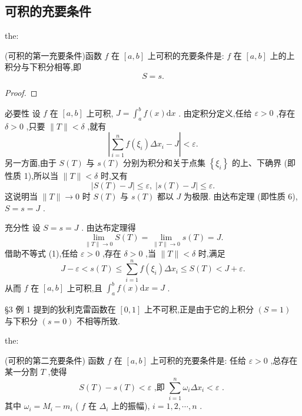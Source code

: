 \subsection{可积的充要条件}

\begin{theorem}{}{the:}

\end{theorem}
(可积的第一充要条件)函数 \(f\) 在 \(\left\lbrack  {a,b}\right\rbrack\) 上可积的充要条件是: \(f\) 在 \(\left\lbrack  {a,b}\right\rbrack\) 上的上积分与下积分相等,即
\[
S = s.
\]
\begin{proof}

\end{proof}
必要性 设 \(f\) 在 \(\left\lbrack  {a,b}\right\rbrack\) 上可积, \(J = {\int }_{a}^{b}f\left( x\right) \mathrm{d}x\) . 由定积分定义,任给 \(\varepsilon  > 0\) ,存在 \(\delta  > 0\) ,只要 \(\parallel T\parallel  < \delta\) ,就有
\[
\left| {\mathop{\sum }\limits_{{i = 1}}^{n}f\left( {\xi }_{i}\right) \Delta {x}_{i} - J}\right|  < \varepsilon .
\]
另一方面,由于 \(S\left( T\right)\) 与 \(s\left( T\right)\) 分别为积分和关于点集 \(\left\{  {\xi }_{i}\right\}\) 的上、下确界 (即性质 1),所以当 \(\parallel T\parallel  < \delta\) 时,又有
\[
\left| {S\left( T\right)  - J}\right|  \leq  \varepsilon ,\;\left| {s\left( T\right)  - J}\right|  \leq  \varepsilon .
\]
这说明当 \(\parallel T\parallel  \rightarrow  0\) 时 \(S\left( T\right)\) 与 \(s\left( T\right)\) 都以 \(J\) 为极限. 由达布定理 (即性质 6), \(S = s = J\) .

充分性 设 \(S = s = J\) . 由达布定理得
\[
\mathop{\lim }\limits_{{\parallel T\parallel  \rightarrow  0}}S\left( T\right)  = \mathop{\lim }\limits_{{\parallel T\parallel  \rightarrow  0}}s\left( T\right)  = J. \tag{5}
\]
借助不等式 (1),任给 \(\varepsilon  > 0\) ,存在 \(\delta  > 0\) ,当 \(\parallel T\parallel  < \delta\) 时,满足
\[
J - \varepsilon  < s\left( T\right)  \leq  \mathop{\sum }\limits_{{i = 1}}^{n}f\left( {\xi }_{i}\right) \Delta {x}_{i} \leq  S\left( T\right)  < J + \varepsilon .
\]
从而 \(f\) 在 \(\left\lbrack  {a,b}\right\rbrack\) 上可积,且 \({\int }_{a}^{b}f\left( x\right) \mathrm{d}x = J\) .

§3 例 1 提到的狄利克雷函数在 \(\left\lbrack  {0,1}\right\rbrack\) 上不可积,正是由于它的上积分 \(\left( {S = 1}\right)\) 与下积分 \(\left( {s = 0}\right)\) 不相等所致.



\begin{theorem}{}{the:}

\end{theorem}
 (可积的第二充要条件) 函数 \(f\) 在 \(\left\lbrack  {a,b}\right\rbrack\) 上可积的充要条件是: 任给 \(\varepsilon  > 0\) ,总存在某一分割 \(T\) ,使得
\[
S\left( T\right)  - s\left( T\right)  < \varepsilon \text{ ,即 }\mathop{\sum }\limits_{{i = 1}}^{n}{\omega }_{i}\Delta {x}_{i} < \varepsilon \text{ . }
\]
其中 \({\omega }_{i} = {M}_{i} - {m}_{i}\) ( \(f\) 在 \({\Delta }_{i}\) 上的振幅), \(i = 1,2,\cdots ,n\) .

